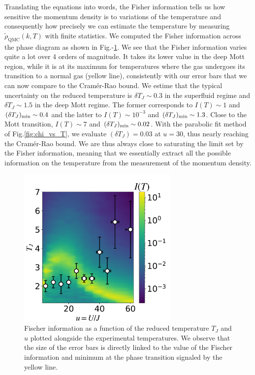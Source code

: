 \noindent Translating the equations into words, the Fisher information tells us how sensitive the momentum density is to variations of the temperature and consequently how precisely we can estimate the temperature by measuring  $\tilde{\rho}_{\mathrm{QMC}}(k, T)$ with finite statistics. We computed the Fisher information across the phase diagram as shown in Fig.-\ref{fig:fisher_info}. We see that the Fisher information varies quite a lot over 4 orders of magnitude. It takes its lower value in the deep Mott region, while it is at its maximum for temperatures where the gas undergoes its transition to a normal gas (yellow line), consistently with our error bars that we can now compare to the Cramér-Rao bound. We estime that the typical uncertainty on the reduced temperature is $\delta T_J  \sim 0.3$ in the superfluid regime and $\delta T_J  \sim 1.5$ in the deep Mott regime. The former corresponds to $I(T) \sim 1$ and $(\delta T_J)_{\rm{min}} \sim 0.4$ and the latter to  $I(T) \sim 10^{-3}$ and $(\delta T_J)_{\rm{min}} \sim 1.3$. Close to the Mott transition, $I(T) \sim 7$ and $(\delta T_J)_{\rm{min}} \sim 0.02$. With the parabolic fit method of Fig.\ref{fig:chi_vs_T}, we evaluate $(\delta T_J)=0.03$ at $u=30$, thus nearly reaching the Cramér-Rao bound. We are thus always close to saturating the limit set by the Fisher information, meaning that we essentially extract all the possible information on the temperature from the measurement of the momentum density.

\begin{figure}
    \centering
    \includegraphics[width=0.7\textwidth]{Fig/Chapter3/fisher_info.png}
    \caption[Fischer information as a function of the reduced temperature $T_J$ and $u$]{Fischer information as a function of the reduced temperature $T_J$ and $u$ plotted alongside the experimental temperatures. We observe that the size of the error bars is directly linked to the value of the Fischer information and minimum at the phase transition signaled by the yellow line.}
    \label{fig:fisher_info}
\end{figure}


